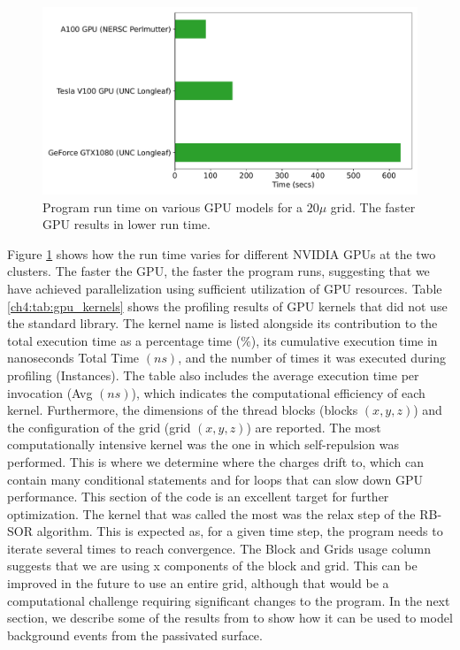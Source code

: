 \begin{figure}[!htb]
    \centering
    \includegraphics[width=0.99\linewidth]{ch4/figs/gpu_comp.pdf}
\caption{\label{ch4:fig:GPU_comp} Program run time on various GPU models for a $20\mu$ grid. The faster GPU results in lower run time.}
\end{figure}

Figure \ref{ch4:fig:GPU_comp} shows how the run time varies for different NVIDIA GPUs at the two clusters. The faster the GPU, the faster the program runs, suggesting that we have achieved parallelization using sufficient utilization of GPU resources. Table \ref{ch4:tab:gpu_kernels} shows the profiling results of GPU kernels that did not use the standard library. The kernel name is listed alongside its contribution to the total execution time as a percentage time ($\%$), its cumulative execution time in nanoseconds Total Time $(ns)$, and the number of times it was executed during profiling (Instances). The table also includes the average execution time per invocation (Avg $(ns)$), which indicates the computational efficiency of each kernel. Furthermore, the dimensions of the thread blocks (blocks $(x, y, z)$) and the configuration of the grid (grid $(x, y, z)$) are reported. The most computationally intensive kernel was the one in which self-repulsion was performed. This is where we determine where the charges drift to, which can contain many conditional statements and for loops that can slow down GPU performance. This section of the code is an excellent target for further optimization. The kernel that was called the most was the relax step of the RB-SOR algorithm. This is expected as, for a given time step, the program needs to iterate several times to reach convergence. The Block and Grids usage column suggests that we are using x components of the block and grid. This can be improved in the future to use an entire grid, although that would be a computational challenge requiring significant changes to the program. In the next section, we describe some of the results from {\ehd} to show how it can be used to model background events from the passivated surface.

